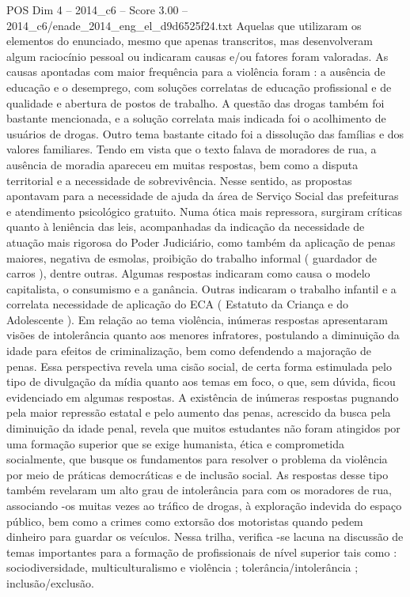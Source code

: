 \begin{textsample}{POS Dim 4 – 2014\_c6 – Score 3.00 – 2014\_c6/enade\_2014\_eng\_el\_d9d6525f24.txt}
Aquelas que utilizaram os elementos do enunciado, mesmo que apenas transcritos, mas desenvolveram algum raciocínio pessoal ou indicaram causas e/ou fatores foram valoradas.
As causas apontadas com maior frequência para a violência foram : a ausência de educação e o desemprego, com soluções correlatas de educação profissional e de qualidade e abertura de postos de trabalho.
A questão das drogas também foi bastante mencionada, e a solução correlata mais indicada foi o acolhimento de usuários de drogas.
Outro tema bastante citado foi a dissolução das famílias e dos valores familiares.
Tendo em vista que o texto falava de moradores de rua, a ausência de moradia apareceu em muitas respostas, bem como a disputa territorial e a necessidade de sobrevivência.
Nesse sentido, as propostas apontavam para a necessidade de ajuda da área de Serviço Social das prefeituras e atendimento psicológico gratuito.
Numa ótica mais repressora, surgiram críticas quanto à leniência das leis, acompanhadas da indicação da necessidade de atuação mais rigorosa do Poder Judiciário, como também da aplicação de penas maiores, negativa de esmolas, proibição do trabalho informal ( guardador de carros ), dentre outras.
Algumas respostas indicaram como causa o modelo capitalista, o consumismo e a ganância.
Outras indicaram o trabalho infantil e a correlata necessidade de aplicação do ECA ( Estatuto da Criança e do Adolescente ).
Em relação ao tema violência, inúmeras respostas apresentaram visões de intolerância quanto aos menores infratores, postulando a diminuição da idade para efeitos de criminalização, bem como defendendo a majoração de penas.
Essa perspectiva revela uma cisão social, de certa forma estimulada pelo tipo de divulgação da mídia quanto aos temas em foco, o que, sem dúvida, ficou evidenciado em algumas respostas.
A existência de inúmeras respostas pugnando pela maior repressão estatal e pelo aumento das penas, acrescido da busca pela diminuição da idade penal, revela que muitos estudantes não foram atingidos por uma formação superior que se exige humanista, ética e comprometida socialmente, que busque os fundamentos para resolver o problema da violência por meio de práticas democráticas e de inclusão social.
As respostas desse tipo também revelaram um alto grau de intolerância para com os moradores de rua, associando -os muitas vezes ao tráfico de drogas, à exploração indevida do espaço público, bem como a crimes como extorsão dos motoristas quando pedem dinheiro para guardar os veículos.
Nessa trilha, verifica -se lacuna na discussão de temas importantes para a formação de profissionais de nível superior tais como : sociodiversidade, multiculturalismo e violência ; tolerância/intolerância ; inclusão/exclusão.

\end{textsample}
